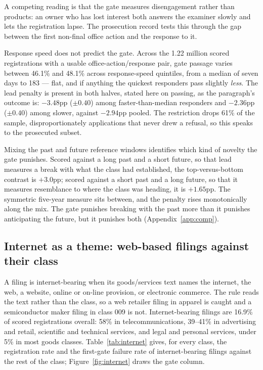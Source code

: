 A competing reading is that the gate measures disengagement rather than
products: an owner who has lost interest both answers the examiner slowly
and lets the registration lapse. The prosecution record tests this through
the gap between the first non-final office action and the response to it.

Response speed does not predict the gate. Across the 1.22 million scored
registrations with a usable office-action/response pair, gate passage varies
between 46.1\% and 48.1\% across response-speed quintiles, from a median of
seven days to 183 --- flat, and if anything the quickest responders pass
slightly \emph{less}. The lead penalty is present in both halves, stated
here on passing, as the paragraph's outcome is: $-3.48$pp
($\pm 0.40$) among faster-than-median responders and $-2.36$pp ($\pm 0.40$)
among slower, against $-2.94$pp pooled. The restriction drops 61\% of
the sample, disproportionately applications that never drew a refusal, so
this speaks to the prosecuted subset.

Mixing the past and future reference windows identifies which kind of
novelty the gate punishes. Scored against a long past and a short future,
so that lead measures a break with what the class had established, the
top-versus-bottom contrast is $+3.0$pp; scored against a short past and a
long future, so that it measures resemblance to where the class was
heading, it is $+1.65$pp. The symmetric five-year measure sits between, and
the penalty rises monotonically along the mix. The gate punishes breaking
with the past more than it punishes anticipating the future, but it
punishes both (Appendix~\ref{app:comp}).

\subsection{Internet as a theme: web-based filings against their class}\label{sec:internet}

A filing is internet-bearing when its goods/services text names the
internet, the web, a website, online or on-line provision, or electronic
commerce. The rule reads the text rather than the class, so a web retailer
filing in apparel is caught and a semiconductor maker filing in class 009 is
not. Internet-bearing filings are 16.9\% of scored registrations overall:
58\% in telecommunications, 39--41\% in advertising and retail, scientific
and technical services, and legal and personal services, under 5\% in most
goods classes. Table~\ref{tab:internet} gives, for every class, the
registration rate and the first-gate failure rate of internet-bearing
filings against the rest of the class; Figure~\ref{fig:internet} draws the
gate column.

